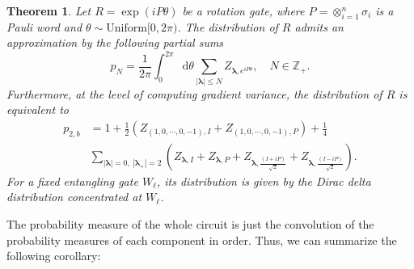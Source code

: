 \documentclass[%
 reprint,
 superscriptaddress,
 amsmath,amssymb,
 aps, prl, twocolumn, showpacs,
]{revtex4-2}
\newtheorem{theorem}{Theorem}
\newcommand*{\dif}{\mathop{}\!\mathrm{d}}
\begin{document}
\begin{theorem}
    Let $R = \exp(iP\theta)$ be a rotation gate, where $P=\otimes_{i=1}^n\sigma_i$ is a Pauli word and $\theta\sim \mathrm{Uniform}[0, 2\pi)$. The distribution of $R$ admits an approximation by the following partial sums 
    \begin{equation}
        p_N = \frac{1}{2\pi}\int_0^{2\pi}\dif\theta\sum_{|{\boldsymbol\lambda}|\leq N}Z_{{\boldsymbol\lambda}, e^{iP\theta}},\quad N\in \mathbb{Z}_+.
    \end{equation}
    Furthermore, at the level of computing gradient variance, the distribution of $R$ is equivalent to
    \begin{equation}
        \begin{aligned}
           p_{2,b} &= 1 + \frac{1}{2}(Z_{(1,0,\cdots,0,-1),I} + Z_{(1,0,\cdots,0,-1),P})
            + \frac{1}{4}\\
            &\sum_{|{\boldsymbol\lambda}| = 0,\ |{\boldsymbol\lambda}_+| = 2}(Z_{{\boldsymbol\lambda},I} + Z_{{\boldsymbol\lambda},P} + Z_{{\boldsymbol\lambda},\frac{(I+iP)}{\sqrt{2}}} + Z_{{\boldsymbol\lambda},\frac{(I-iP)}{\sqrt{2}}}).
        \end{aligned}
    \end{equation}
    For a fixed entangling gate $W_\ell$, its distribution is given by the Dirac delta distribution concentrated at $W_\ell$.
    \label{thm:comp}
\end{theorem}
The probability measure of the whole circuit is just the convolution of the probability measures of each component in order. Thus, we can summarize the following corollary:
\end{document}
